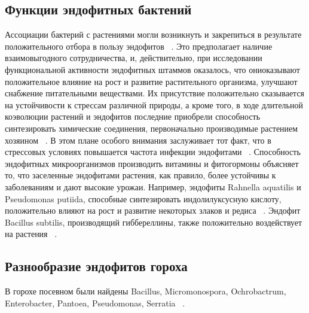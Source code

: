 \documentclass[11pt]{article}
\begin{document}
\subsection{Функции эндофитных бактений}
Ассоциации бактерий с растениями могли возникнуть и закрепиться в результате положительного отбора в пользу эндофитов ~\cite{v_85}.
Это предполагает наличие взаимовыгодного сотрудничества, и, действительно, при исследовании функциональной активности эндофитных штаммов оказалось, что ониоказывают положительное влияние на рост и развитие растительного организма, улучшают снабжение питательными веществами. Их присутствие положительно сказывается на устойчивости к стрессам различной природы, а кроме того, в ходе длительной коэволюции растений и эндофитов последние приобрели способность синтезировать химические соединения, первоначально производимые растением хозяином ~\cite{v_11, v_86}. В этом плане особого внимания заслуживает тот факт, что в стрессовых условиях повышается частота инфекции эндофитами ~\cite{v_17}.
Способность эндофитных микроорганизмов производить витамины и фитогормоны объясняет то, что заселенные эндофитами растения, как правило, более устойчивы к заболеваниям и дают высокие урожаи. Например, эндофиты Rahnella aquatilis и Pseudomonas putiida, способные синтезировать индолилуксусную кислоту, положительно влияют на рост и развитие некоторых злаков и редиса ~\cite{v_87}. Эндофит Bacillus subtilis, производящий гиббереллины, также положительно воздействует на растения ~\cite{v_88}.

\subsection{Разнообразие эндофитов гороха}
В горохе посевном были найдены Bacillus, Micromonospora, Ochrobactrum, Enterobacter, Pantoea, Pseudomonas, Serratia ~\cite{v_48, v_54, v_55, v_57, v_58}.
\end{document}
